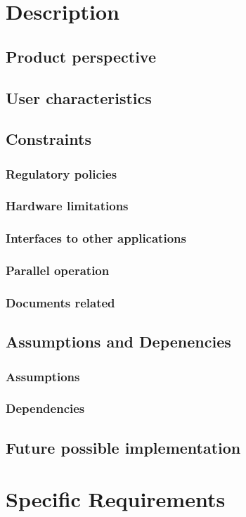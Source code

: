\documentclass[11pt,a4paper,titlepage]{article}
\begin{document}
\section{Description}
\subsection{Product perspective}
\subsection{User characteristics}
\subsection{Constraints}
\subsubsection{Regulatory policies}
\subsubsection{Hardware limitations}
\subsubsection{Interfaces to other applications}
\subsubsection{Parallel operation}
\subsubsection{Documents related}
\subsection{Assumptions and Depenencies}
\subsubsection{Assumptions}
\subsubsection{Dependencies}
\subsection{Future possible implementation}

\section{Specific Requirements}
\end{document}

